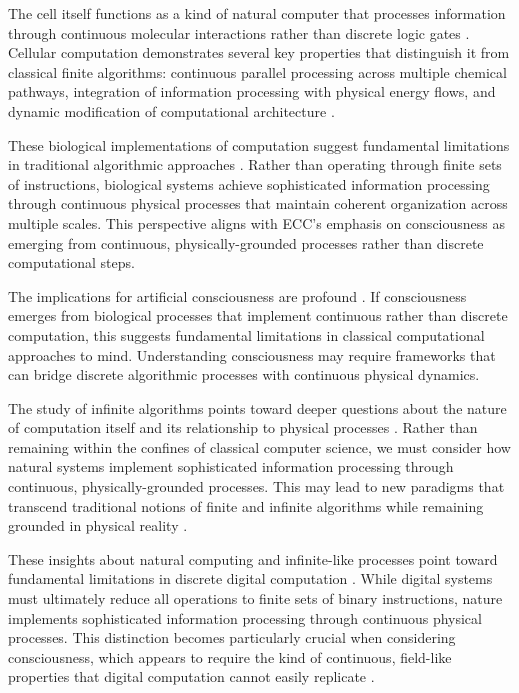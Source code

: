 \begin{refsection}
The cell itself functions as a kind of natural computer that processes information through continuous molecular interactions rather than discrete logic gates \cite{Rovelli2018}. Cellular computation demonstrates several key properties that distinguish it from classical finite algorithms: continuous parallel processing across multiple chemical pathways, integration of information processing with physical energy flows, and dynamic modification of computational architecture \cite{Aaronson2013}.

These biological implementations of computation suggest fundamental limitations in traditional algorithmic approaches \cite{Copeland2004}. Rather than operating through finite sets of instructions, biological systems achieve sophisticated information processing through continuous physical processes that maintain coherent organization across multiple scales. This perspective aligns with ECC's emphasis on consciousness as emerging from continuous, physically-grounded processes rather than discrete computational steps.

The implications for artificial consciousness are profound \cite{Rogers1987}. If consciousness emerges from biological processes that implement continuous rather than discrete computation, this suggests fundamental limitations in classical computational approaches to mind. Understanding consciousness may require frameworks that can bridge discrete algorithmic processes with continuous physical dynamics.

The study of infinite algorithms points toward deeper questions about the nature of computation itself and its relationship to physical processes \cite{Hamkins2014}. Rather than remaining within the confines of classical computer science, we must consider how natural systems implement sophisticated information processing through continuous, physically-grounded processes. This may lead to new paradigms that transcend traditional notions of finite and infinite algorithms while remaining grounded in physical reality \cite{Sipser2012}.

These insights about natural computing and infinite-like processes point toward fundamental limitations in discrete digital computation \cite{Wegner2003}. While digital systems must ultimately reduce all operations to finite sets of binary instructions, nature implements sophisticated information processing through continuous physical processes. This distinction becomes particularly crucial when considering consciousness, which appears to require the kind of continuous, field-like properties that digital computation cannot easily replicate \cite{PourEl1989}.


\end{refsection}
